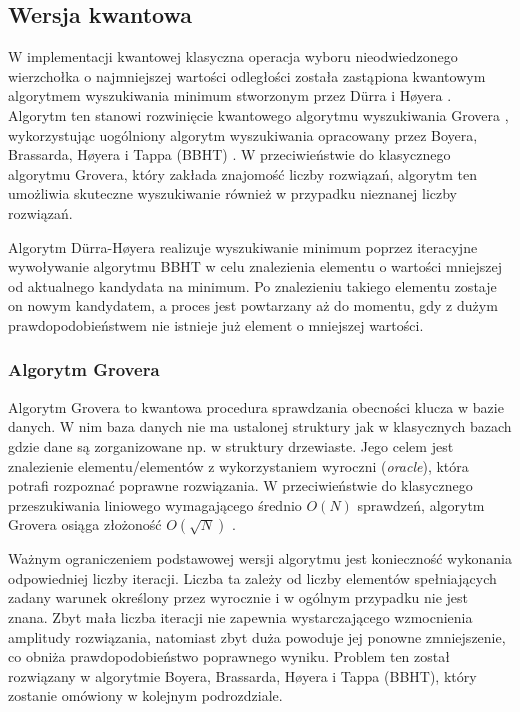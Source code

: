 \subsection{Wersja kwantowa}

W implementacji kwantowej klasyczna operacja wyboru nieodwiedzonego wierzchołka o najmniejszej wartości odległości została zastąpiona kwantowym algorytmem wyszukiwania minimum stworzonym przez Dürra i Høyera \cite{duerr1996}. Algorytm ten stanowi rozwinięcie kwantowego algorytmu wyszukiwania Grovera \cite{grover1996}, wykorzystując uogólniony algorytm wyszukiwania opracowany przez Boyera, Brassarda, Høyera i Tappa (BBHT) \cite{bbht1996}. W przeciwieństwie do klasycznego algorytmu Grovera, który zakłada znajomość liczby rozwiązań, algorytm ten umożliwia skuteczne wyszukiwanie również w przypadku nieznanej liczby rozwiązań.

Algorytm Dürra-Høyera realizuje wyszukiwanie minimum poprzez iteracyjne wywoływanie algorytmu BBHT w celu znalezienia elementu o wartości mniejszej od aktualnego kandydata na minimum. Po znalezieniu takiego elementu zostaje on nowym kandydatem, a proces jest powtarzany aż do momentu, gdy z dużym prawdopodobieństwem nie istnieje już element o mniejszej wartości. 

\subsubsection{Algorytm Grovera}

Algorytm Grovera to kwantowa procedura sprawdzania obecności klucza w bazie danych. W nim baza danych nie ma ustalonej struktury jak w klasycznych bazach  gdzie dane są zorganizowane np. w struktury drzewiaste. Jego celem jest znalezienie elementu/elementów z wykorzystaniem wyroczni (\textit{oracle}), która potrafi rozpoznać poprawne rozwiązania. W przeciwieństwie do klasycznego przeszukiwania liniowego wymagającego średnio $O(N)$ sprawdzeń, algorytm Grovera osiąga złożoność $O(\sqrt{N})$ \cite{grover1996} .

Ważnym ograniczeniem podstawowej wersji algorytmu jest konieczność wykonania odpowiedniej liczby iteracji. Liczba ta zależy od liczby elementów spełniających zadany warunek określony przez wyrocznie i w ogólnym przypadku nie jest znana. Zbyt mała liczba iteracji nie zapewnia wystarczającego wzmocnienia amplitudy rozwiązania, natomiast zbyt duża powoduje jej ponowne zmniejszenie, co obniża prawdopodobieństwo poprawnego wyniku. Problem ten został rozwiązany w algorytmie Boyera, Brassarda, Høyera i Tappa (BBHT), który zostanie omówiony w kolejnym podrozdziale.

